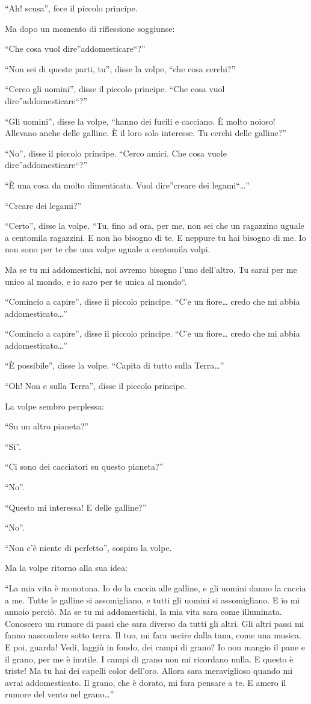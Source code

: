 \documentclass[11pt]{scrbook}
\begin{document}
``Ah! scusa'', fece il piccolo principe.

Ma dopo un momento di riflessione soggiunse:

``Che cosa vuol dire''addomesticare``?''

``Non sei di queste parti, tu'', disse la volpe, ``che cosa cerchi?''

``Cerco gli uomini'', disse il piccolo principe. ``Che cosa vuol
dire''addomesticare``?''

``Gli uomini'', disse la volpe, ``hanno dei fucili e cacciano. È molto
noioso! Allevano anche delle galline. È il loro solo interesse. Tu
cerchi delle galline?''

``No'', disse il piccolo principe. ``Cerco amici. Che cosa vuole
dire''addomesticare``?''

``È una cosa da molto dimenticata. Vuol dire''creare dei
legami``\ldots{}''

``Creare dei legami?''

``Certo'', disse la volpe. ``Tu, fino ad ora, per me, non sei che un
ragazzino uguale a centomila ragazzini. E non ho bisogno di te. E
neppure tu hai bisogno di me. Io non sono per te che una volpe uguale a
centomila volpi.

Ma se tu mi addomestichi, noi avremo bisogno l'uno dell'altro. Tu sarai
per me unico al mondo, e io saro per te unica al mondo``.

``Comincio a capire'', disse il piccolo principe. ``C'e un fiore\ldots{}
credo che mi abbia addomesticato\ldots{}''

``Comincio a capire'', disse il piccolo principe. ``C'e un fiore\ldots{}
credo che mi abbia addomesticato\ldots{}''

``È possibile'', disse la volpe. ``Capita di tutto sulla Terra\ldots{}''

``Oh! Non e sulla Terra'', disse il piccolo principe.

La volpe sembro perplessa:

``Su un altro pianeta?''

``Si''.

``Ci sono dei cacciatori su questo pianeta?''

``No''.

``Questo mi interessa! E delle galline?''

``No''.

``Non c'è niente di perfetto'', sospiro la volpe.

Ma la volpe ritorno alla sua idea:

``La mia vita è monotona. Io do la caccia alle galline, e gli uomini
danno la caccia a me. Tutte le galline si assomigliano, e tutti gli
uomini si assomigliano. E io mi annoio perciò. Ma se tu mi addomestichi,
la mia vita sara come illuminata. Conoscero un rumore di passi che sara
diverso da tutti gli altri. Gli altri passi mi fanno nascondere sotto
terra. Il tuo, mi fara uscire dalla tana, come una musica. E poi,
guarda! Vedi, laggiù in fondo, dei campi di grano? Io non mangio il pane
e il grano, per me è inutile. I campi di grano non mi ricordano nulla. E
questo è triste! Ma tu hai dei capelli color dell'oro. Allora sara
meraviglioso quando mi avrai addomesticato. Il grano, che è dorato, mi
fara pensare a te. E amero il rumore del vento nel grano\ldots{}''
\end{document}

